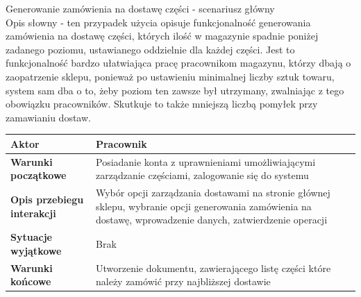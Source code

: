  \item Generowanie zamówienia na dostawę części - scenariusz główny \\
 
 Opis słowny - ten przypadek użycia opisuje funkcjonalność generowania zamówienia na dostawę części, których ilość w magazynie spadnie poniżej zadanego poziomu, ustawianego oddzielnie dla każdej części. Jest to funkcjonalność bardzo ułatwiająca pracę pracownikom magazynu, którzy dbają o zaopatrzenie sklepu, ponieważ po ustawieniu minimalnej liczby sztuk towaru, system sam dba o to, żeby poziom ten zawsze był utrzymany, zwalniając z tego obowiązku pracowników. Skutkuje to także mniejszą liczbą pomyłek przy zamawianiu dostaw.
 
 \begin{longtable}{|p{5cm}|p{7cm}|}
 	\hline
	\textbf{Aktor} & Pracownik \\
	\hline
	\textbf{Warunki początkowe} & Posiadanie konta z uprawnieniami umożliwiającymi zarządzanie częściami, zalogowanie się do systemu \\
	\hline
	\textbf{Opis przebiegu interakcji} & Wybór opcji zarządzania dostawami na stronie głównej sklepu, wybranie opcji generowania zamówienia na dostawę, wprowadzenie danych, zatwierdzenie operacji \\
	\hline
	\textbf{Sytuacje wyjątkowe} & Brak \\
	\hline
	\textbf{Warunki końcowe} & Utworzenie dokumentu, zawierającego listę części które należy zamówić przy najbliższej dostawie \\
	\hline
 \end{longtable}
 

